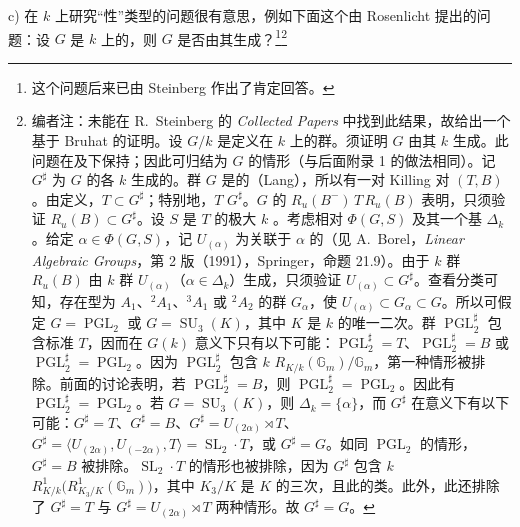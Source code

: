 c) 在 $k$ 上研究“性”类型的问题很有意思，例如下面这个由 Rosenlicht 提出的问题：设 $G$ 是 $k$ 上的，则 $G$ 是否由其生成？\footnote{这个问题后来已由 Steinberg 作出了肯定回答。}\footnote{编者注：未能在 R.~Steinberg 的 \emph{Collected Papers} 中找到此结果，故给出一个基于 Bruhat 的证明。设 $G/k$ 是定义在 $k$ 上的群。须证明 $G$ 由其 $k$ 生成。此问题在及下保持；因此可归结为 $G$ 的情形（与后面附录 1 的做法相同）。记 $G^\sharp$ 为 $G$ 的各 $k$ 生成的。群 $G$ 是的（Lang），所以有一对 Killing 对 $(T,B)$。由定义，$T\subset G^\sharp$；特别地，$T$  $G^\sharp$。$G$ 的 $R_u(B^-)\,T\,R_u(B)$ 表明，只须验证 $R_u(B)\subset G^\sharp$。设 $S$ 是 $T$ 的极大 $k$ 。考虑相对 $\Phi(G,S)$ 及其一个基 $\Delta_k$。给定 $\alpha\in\Phi(G,S)$，记 $U_{(\alpha)}$ 为关联于 $\alpha$ 的（见 A.~Borel，\emph{Linear Algebraic Groups}，第 2 版（1991），Springer，命题 21.9）。由于 $k$ 群 $R_u(B)$ 由 $k$ 群 $U_{(\alpha)}$（$\alpha\in\Delta_k$）生成，只须验证 $U_{(\alpha)}\subset G^\sharp$。查看分类可知，存在型为 $A_1$、${}^2A_1$、${}^3A_1$ 或 ${}^2A_2$ 的群 $G_\alpha$，使 $U_{(\alpha)}\subset G_\alpha\subset G$。所以可假定 $G=\operatorname{PGL}_2$ 或 $G=\operatorname{SU}_3(K)$，其中 $K$ 是 $k$ 的唯一二次。群 $\operatorname{PGL}_2^\sharp$ 包含标准 $T$，因而在 $G(k)$ 意义下只有以下可能：$\operatorname{PGL}_2^\sharp=T$、$\operatorname{PGL}_2^\sharp=B$ 或 $\operatorname{PGL}_2^\sharp=\operatorname{PGL}_2$。因为 $\operatorname{PGL}_2^\sharp$ 包含 $k$  $R_{K/k}(\mathbb G_m)/\mathbb G_m$，第一种情形被排除。前面的讨论表明，若 $\operatorname{PGL}_2^\sharp=B$，则 $\operatorname{PGL}_2^\sharp=\operatorname{PGL}_2$。因此有 $\operatorname{PGL}_2^\sharp=\operatorname{PGL}_2$。若 $G=\operatorname{SU}_3(K)$，则 $\Delta_k=\{\alpha\}$，而 $G^\sharp$ 在意义下有以下可能：$G^\sharp=T$、$G^\sharp=B$、$G^\sharp=U_{(2\alpha)}\rtimes T$、$G^\sharp=\langle U_{(2\alpha)},U_{(-2\alpha)},T\rangle=\operatorname{SL}_2\cdot T$，或 $G^\sharp=G$。如同 $\operatorname{PGL}_2$ 的情形，$G^\sharp=B$ 被排除。$\operatorname{SL}_2\cdot T$ 的情形也被排除，因为 $G^\sharp$ 包含 $k$  $R^1_{K/k}\bigl(R^1_{K_3/K}(\mathbb G_m)\bigr)$，其中 $K_3/K$ 是 $K$ 的三次，且此的类。此外，此还排除了 $G^\sharp=T$ 与 $G^\sharp=U_{(2\alpha)}\rtimes T$ 两种情形。故 $G^\sharp=G$。}
